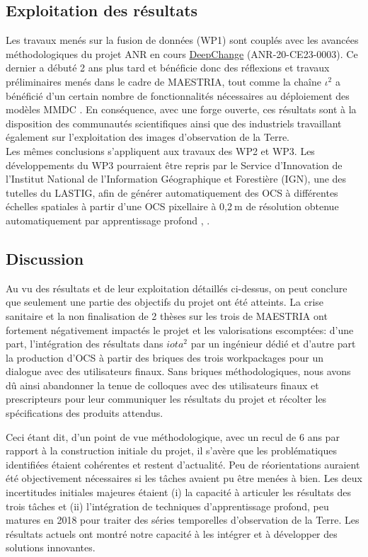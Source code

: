 \subsection{Exploitation des résultats}
Les travaux menés sur la fusion de données (WP1) sont couplés avec les avancées méthodologiques du projet ANR en cours \href{https://anr.hal.science/search/index/?q=*&anrProjectReference_s=ANR-20-CE23-0003}{DeepChange} (ANR-20-CE23-0003). Ce dernier a débuté 2 ans plus tard et bénéficie donc des réflexions et travaux préliminaires menés dans le cadre de MAESTRIA, tout comme la chaîne $\iota^2$ a bénéficié d'un certain nombre de fonctionnalités nécessaires au déploiement des modèles MMDC \cite{zerah-2023-physic-driven}. En conséquence, avec une forge ouverte, ces résultats sont à la disposition des communautés scientifiques ainsi que des industriels travaillant également sur l'exploitation des images d'observation de la Terre.\\
Les mêmes conclusions s'appliquent aux travaux des WP2 et WP3. Les développements du WP3 pourraient être repris par le Service d'Innovation de l'Institut National de l'Information Géographique et Forestière (IGN), une des tutelles du LASTIG, afin de générer automatiquement des OCS à différentes échelles spatiales à partir d'une OCS pixellaire à 0,2$\:$m de résolution obtenue automatiquement par apprentissage profond \cite{garioud2023flair}, \cite{garioud2023flair2}.


\subsection{Discussion} 
Au vu des résultats et de leur exploitation détaillés ci-dessus, on peut conclure que seulement une partie des objectifs du projet ont été atteints. La crise sanitaire et la non finalisation de 2 thèses sur les trois de MAESTRIA ont fortement négativement impactés le projet et les valorisations escomptées: d'une part, l'intégration des résultats dans $iota^2$ par un ingénieur dédié et d'autre part la production d'OCS à partir des briques des trois workpackages pour un dialogue avec des utilisateurs finaux. Sans briques méthodologiques, nous avons dû ainsi abandonner la tenue de colloques avec des utilisateurs finaux et prescripteurs pour leur communiquer les résultats du projet et récolter les spécifications des produits attendus. 

Ceci étant dit, d'un point de vue méthodologique, avec un recul de 6 ans par rapport à la construction initiale du projet, il s'avère que les problématiques identifiées étaient cohérentes et restent d'actualité. Peu de réorientations auraient été objectivement nécessaires si les tâches avaient pu être menées à bien. Les deux incertitudes initiales majeures étaient (i) la capacité à articuler les résultats des trois tâches et (ii) l'intégration de techniques d'apprentissage profond, peu matures en 2018 pour traiter des séries temporelles d'observation de la Terre. Les résultats actuels ont montré notre capacité à les intégrer et à développer des solutions innovantes.

